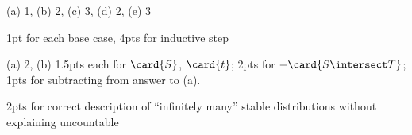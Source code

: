 \documentclass[quiz]{mcs}
\begin{document}
\examspace 
\begin{staffnotes}
(a) 1, (b) 2, (c) 3, (d) 2, (e) 3
\end{staffnotes}

\examspace
\begin{staffnotes}
1pt for each base case, 4pts for inductive step
\end{staffnotes}

\examspace
\begin{staffnotes}
(a) 2, (b) 1.5pts each for $\card{S}$, $\card{t}$; 2pts for $-\card{S \intersect T}$; 1pts for
  subtracting from answer to (a).
\end{staffnotes}

\examspace
{}

\examspace
\begin{staffnotes}
2pts for correct description of ``infinitely many'' stable distributions without explaining uncountable
\end{staffnotes}
\end{document}
